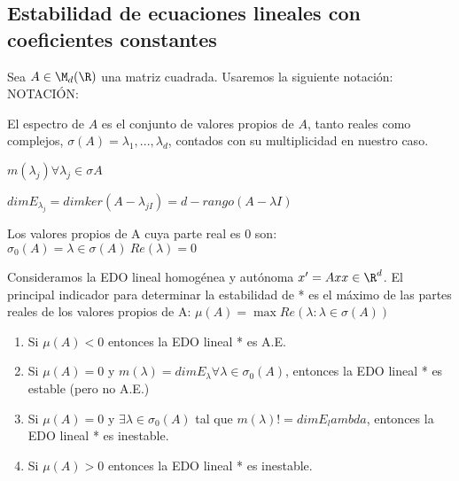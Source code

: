 \subsection{Estabilidad de ecuaciones lineales con coeficientes constantes}
Sea $A \in \M_d(\R)$ una matriz cuadrada.  Usaremos la siguiente notación:
NOTACIÓN:
\begin{ndef}[Espectro de $A$]
El espectro de $A$ es el conjunto de valores propios de $A$, tanto reales como complejos, $\sigma(A)={\lambda_1,...,\lambda_d}$, contados con su multiplicidad en nuestro caso.
\end{ndef}
\begin{ndef}
$m(\lambda_j) \forall \lambda_j \in \sigma{A}$
\end{ndef}
\begin{ndef}
$dim E_{\lambda_j} = dim ker(A-\lambda_{jI})= d-rango(A-\lambda I)$
\end{ndef}
\begin{ndef}
Los valores propios de A cuya parte real es 0 son:
$\sigma_0(A)={\lambda \in \sigma(A) \ Re(\lambda)=0}$
\end{ndef}

Consideramos la EDO lineal homogénea y autónoma $x'=Ax x\in\R^d$. El principal indicador para determinar la estabilidad de * es el máximo de las partes reales de los valores propios de A:
$\mu(A)=\max{Re(\lambda : \lambda\in\sigma(A))}$

\begin{nth}
\begin{enumerate}
\item Si $\mu(A)<0$ entonces la EDO lineal * es A.E.
\item Si $\mu(A)=0$ y $m(\lambda)=dimE_\lambda \forall \lambda \in \sigma_0(A)$, entonces la EDO lineal * es estable (pero no A.E.)
\item Si $\mu(A)=0$ y $\exists \lambda \in \sigma_0(A)$ tal que $m(\lambda) != dim E_lambda$, entonces la EDO lineal * es inestable.
\item Si $\mu(A)>0$ entonces la EDO lineal * es inestable.
\end{enumerate}
\end{nth}

